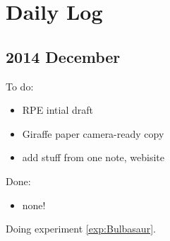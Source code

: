 \chapter{Daily Log}

\section{2014 December}

To do:
\begin{itemize}
\item RPE intial draft
\item Giraffe paper camera-ready copy
\item add stuff from one note, webisite
\end{itemize}

Done:
\begin{itemize}
\item none!
\end{itemize}


Doing experiment \ref{exp:Bulbasaur}.
